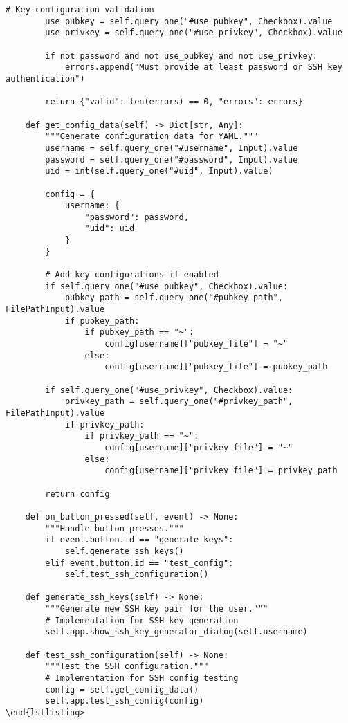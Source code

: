 \documentclass[11pt,a4paper]{article}
\begin{document}
\begin{lstlisting}[caption={ValidatedInput Implementation}]
        # Key configuration validation
        use_pubkey = self.query_one("#use_pubkey", Checkbox).value
        use_privkey = self.query_one("#use_privkey", Checkbox).value
        
        if not password and not use_pubkey and not use_privkey:
            errors.append("Must provide at least password or SSH key authentication")
            
        return {"valid": len(errors) == 0, "errors": errors}
        
    def get_config_data(self) -> Dict[str, Any]:
        """Generate configuration data for YAML."""
        username = self.query_one("#username", Input).value
        password = self.query_one("#password", Input).value
        uid = int(self.query_one("#uid", Input).value)
        
        config = {
            username: {
                "password": password,
                "uid": uid
            }
        }
        
        # Add key configurations if enabled
        if self.query_one("#use_pubkey", Checkbox).value:
            pubkey_path = self.query_one("#pubkey_path", FilePathInput).value
            if pubkey_path:
                if pubkey_path == "~":
                    config[username]["pubkey_file"] = "~"
                else:
                    config[username]["pubkey_file"] = pubkey_path
                    
        if self.query_one("#use_privkey", Checkbox).value:
            privkey_path = self.query_one("#privkey_path", FilePathInput).value  
            if privkey_path:
                if privkey_path == "~":
                    config[username]["privkey_file"] = "~"
                else:
                    config[username]["privkey_file"] = privkey_path
                    
        return config
        
    def on_button_pressed(self, event) -> None:
        """Handle button presses."""
        if event.button.id == "generate_keys":
            self.generate_ssh_keys()
        elif event.button.id == "test_config":
            self.test_ssh_configuration()
            
    def generate_ssh_keys(self) -> None:
        """Generate new SSH key pair for the user."""
        # Implementation for SSH key generation
        self.app.show_ssh_key_generator_dialog(self.username)
        
    def test_ssh_configuration(self) -> None:
        """Test the SSH configuration."""
        # Implementation for SSH config testing
        config = self.get_config_data()
        self.app.test_ssh_config(config)
\end{lstlisting>


\end{lstlisting}
\end{document}
